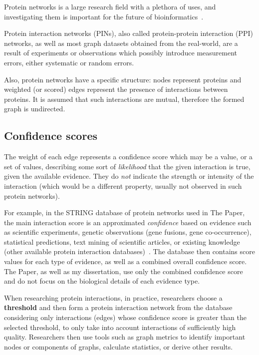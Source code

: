 Protein networks is a large research field with a plethora of uses, and investigating them is important for the future of bioinformatics~.

Protein interaction networks (PINs), also called protein-protein interaction (PPI) networks, as well as most graph datasets obtained from the real-world, are a result of experiments or observations which possibly introduce measurement errors, either systematic or random errors.

Also, protein networks have a specific structure: nodes represent proteins and weighted (or scored) edges represent the presence of interactions between proteins.
It is assumed that such interactions are mutual, therefore the formed graph is undirected.



\subsection{Confidence scores}

The weight of each edge represents a confidence score which may be a value, or a set of values, describing some sort of \textsl{likelihood} that the given interaction is true, given the available evidence.
They do \textsl{not} indicate the strength or intensity of the interaction (which would be a different property, usually not observed in such protein networks).

For example, in the STRING database of protein networks used in The Paper, the main interaction score is an approximated \textsl{confidence} based on evidence such as scientific experiments, genetic observations (gene fusions, gene co-occurrence), statistical predictions, text mining of scientific articles, or existing knowledge (other available protein interaction databases)~\cite{Szklarczyk2019}.
The database then contains score values for each type of evidence, as well as a combined overall confidence score.
The Paper, as well as my dissertation, use only the combined confidence score and do not focus on the biological details of each evidence type.



When researching protein interactions, in practice, researchers choose a \textbf{threshold} and then form a protein interaction network from the database considering only interactions (edges) whose confidence score is greater than the selected threshold, to only take into account interactions of sufficiently high quality.
Researchers then use tools such as graph metrics to identify important nodes or components of graphs, calculate statistics, or derive other results.

